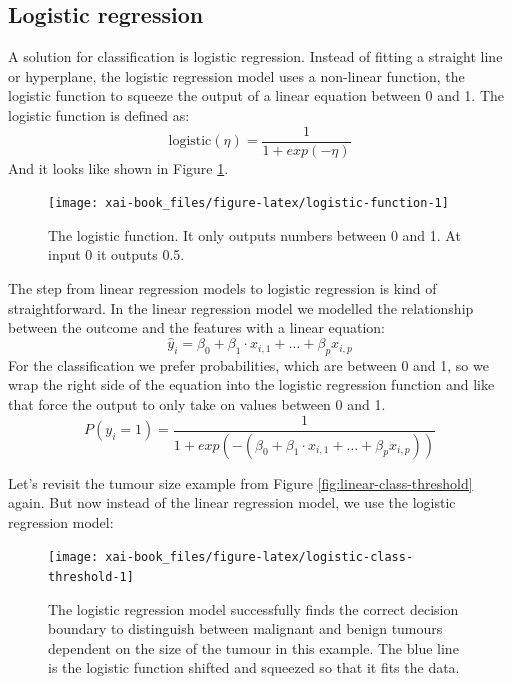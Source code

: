 \documentclass[12pt,]{krantz}
\theoremstyle{definition}
\theoremstyle{definition}
\theoremstyle{definition}
\theoremstyle{remark}
\begin{document}
\subsection{Logistic regression}\label{logistic-regression}

A solution for classification is logistic regression. Instead of fitting
a straight line or hyperplane, the logistic regression model uses a
non-linear function, the logistic function to squeeze the output of a
linear equation between 0 and 1. The logistic function is defined as:
\[ \text{logistic}(\eta) = \frac{1}{1 + exp(-\eta)}\] And it looks like
shown in Figure \ref{fig:logistic-function}.

\begin{figure}

{\centering \texttt{[image: xai-book\_files/figure-latex/logistic-function-1]} 

}

\caption{The logistic function. It only outputs numbers between 0 and 1. At input 0 it outputs 0.5.}\label{fig:logistic-function}
\end{figure}

The step from linear regression models to logistic regression is kind of
straightforward. In the linear regression model we modelled the
relationship between the outcome and the features with a linear
equation:
\[\hat{y}_{i} = \beta_{0} + \beta_{1} \cdot x_{i,1} + \ldots + \beta_{p} x_{i,p} \]
For the classification we prefer probabilities, which are between 0 and
1, so we wrap the right side of the equation into the logistic
regression function and like that force the output to only take on
values between 0 and 1.
\[P(y_{i}=1) =  \frac{1}{1 + exp(-(\beta_{0} + \beta_{1} \cdot x_{i,1} + \ldots + \beta_{p} x_{i,p}))}\]

Let's revisit the tumour size example from Figure
\ref{fig:linear-class-threshold} again. But now instead of the linear
regression model, we use the logistic regression model:

\begin{figure}

{\centering \texttt{[image: xai-book\_files/figure-latex/logistic-class-threshold-1]} 

}

\caption{The logistic regression model successfully finds the correct decision boundary to distinguish between malignant and benign tumours dependent on the size of the tumour in this example. The blue line is the logistic function shifted and squeezed so that it fits the data.}\label{fig:logistic-class-threshold}
\end{figure}
\end{document}
